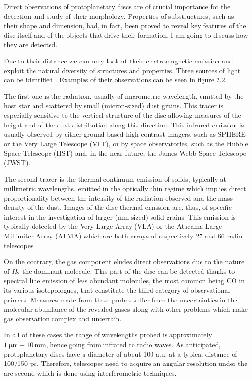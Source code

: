 \documentclass[a4paper,10pt]{report}
\begin{document}
Direct observations of protoplanetary discs are of crucial importance for the detection and study of their morphology.
Properties of substructures, such as their shape and dimension, had, in fact, 
been proved to reveal key features of the disc itself and
of the objects that drive their formation. I am going to discuss how they are detected.

Due to their distance we can only look at their electromagnetic emission
and exploit the natural diversity of structures and properties. 
Three sources of light can be identified \citep{disc_rev}. Examples of their
observations can be seen in figure 2.2.

The first one is the radiation, usually of micrometric wavelength, emitted by the host star and scattered by small (micron-sized) 
dust grains.
This tracer is especially sensitive to the vertical structure 
of the disc allowing measures of the height and of the dust distribution along this direction.
This infrared emission is usually observed by either ground based high contrast imagers, such as SPHERE or the Very Large Telescope (VLT), 
or by space observatories, such as the Hubble Space Telescope (HST) and, in the near future, the James Webb Space Telescope (JWST).

The second tracer is the thermal continuum emission of solids, typically at millimetric wavelengths,
emitted in the optically thin regime which implies direct proportionality between the intensity of the radiation observed and the
mass density of the dust. 
Images of the disc thermal emission are, thus, of specific interest in the investigation of larger (mm-sized) solid grains.
This emission is typically detected by the Very Large Array (VLA) or the Atacama Large Millimiter Array (ALMA) which are both arrays
of respectively 27 and 66 radio telescopes.

On the contrary, the gas component eludes direct observations due to the nature of $H_2$ the dominant molecule.
This part of the disc can be detected thanks to spectral line emission of less abundant molecules,
the most common being CO in its various isotopologues,
that constitute the third category of observational primers. Measures made from these probes suffer from
the uncertainties in the molecular abundance of the revealed gases along with other problems
which make gas observation complex and uncertain.

In all of these cases the range of wavelengths probed is approximately $\SI{1}{\micro\m} - \SI{10}{\mm}$, hence going from infrared to radio waves.
As anticipated, protoplanetary discs have a diameter of about 100 a.u. at a typical distance of 100/150 pc. Therefore, telescopes need to acquire an angular
resolution under the arc second which is done using interferometric techniques.
\end{document}
